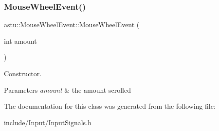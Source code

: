 \subsubsection{\texorpdfstring{Mouse\+Wheel\+Event()}{MouseWheelEvent()}}
{\footnotesize\ttfamily astu\+::\+Mouse\+Wheel\+Event\+::\+Mouse\+Wheel\+Event (\begin{DoxyParamCaption}\item[{int}]{amount }\end{DoxyParamCaption})\hspace{0.3cm}{\ttfamily [inline]}}

Constructor.


\begin{DoxyParams}{Parameters}
{\em amount} & the amount scrolled \\
\hline
\end{DoxyParams}


The documentation for this class was generated from the following file\+:\begin{DoxyCompactItemize}
\item 
include/\+Input/Input\+Signals.\+h\end{DoxyCompactItemize}
